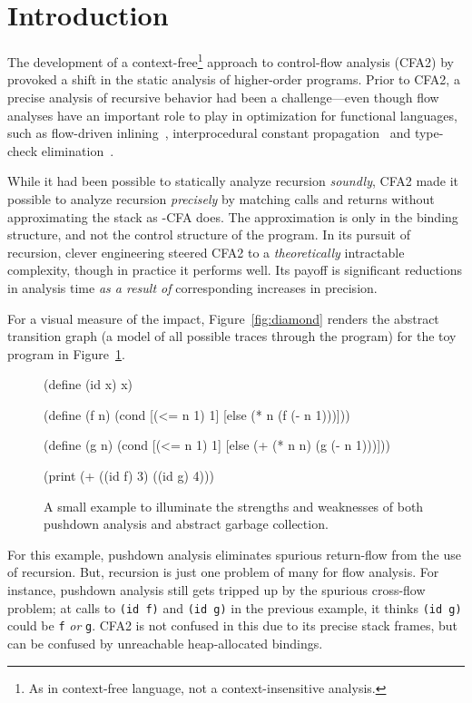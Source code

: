 
\section{Introduction}

The development of a context-free\footnote{As in context-free language, not a context-insensitive analysis.
} approach to control-flow analysis
(CFA2) by \citet{mattmight:Vardoulakis:2010:CFA2} provoked a shift in the
static analysis of higher-order
programs.
Prior to CFA2, a precise analysis of recursive behavior 
had been a challenge---even though flow analyses have an important role to play in 
optimization for functional languages, such as 
flow-driven inlining~\cite{mattmight:Might:2006:DeltaCFA},
interprocedural constant propagation~\cite{mattmight:Shivers:1991:CFA}
and type-check elimination~\cite{mattmight:Wright:1998:Polymorphic}.


While it had been possible to statically analyze
recursion \emph{soundly}, CFA2 made it possible to analyze recursion
\emph{precisely} by matching calls and returns without approximating the stack as -CFA does.
The approximation is only in the binding structure, and not the control structure of the program.
In its pursuit of recursion,
clever engineering steered CFA2 to a \emph{theoretically} intractable complexity, though in practice it performs well.
Its payoff is significant reductions in 
analysis time \emph{as a result of} corresponding increases
in precision.


For a visual measure of the impact, Figure~\ref{fig:diamond}
renders the abstract transition graph (a model of all possible traces through the program) for 
the toy program in Figure~\ref{fig:toy}.
\begin{figure}
\figrule
\begin{code}
(define (id x) x)

(define (f n)
  (cond [(<= n 1)  1]
        [else      (* n (f (- n 1)))]))

(define (g n)
  (cond [(<= n 1)  1]
        [else      (+ (* n n) (g (- n 1)))]))
    
(print (+ ((id f) 3) ((id g) 4)))
\end{code}
\caption{A small example to illuminate the strengths and weaknesses of
  both pushdown analysis and abstract garbage collection.}
\label{fig:toy}
\figrule
\end{figure}
For this example,
pushdown analysis
eliminates spurious return-flow from the
use of  recursion.
But, recursion is just one problem of many for flow analysis.
For instance, pushdown analysis still gets tripped up by
the
spurious cross-flow problem;
at calls to \texttt{(id f)}
and \texttt{(id g)} in the previous example,
it thinks \texttt{(id g)} could be \texttt{f} \emph{or} \texttt{g}.
CFA2 is not confused in this due to its precise stack frames, but can be confused by unreachable heap-allocated bindings.

